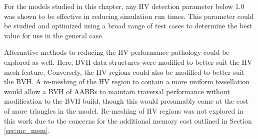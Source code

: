 For the models studied in this chapter, any HV detection parameter below 1.0 was
shown to be effective in reducing simulation run times. This parameter could be
studied and optimized using a broad range of test cases to determine the best
value for use in the general case.

Alternative methods to reducing the HV performance pathology could be explored
as well. Here, BVH data structures were modified to better suit the HV mesh
feature. Conversely, the HV regions could also be modified to better suit the
BVH. A re-meshing of the HV region to contain a more uniform tessellation would
allow a BVH of AABBs to maintain traversal performance without modification to
the BVH build, though this would presumably come at the cost of more triangles
in the model. Re-meshing of HV regions was not explored in this work due to the
concerns for the additional memory cost outlined in Section \ref{sec:mc_mem}.
